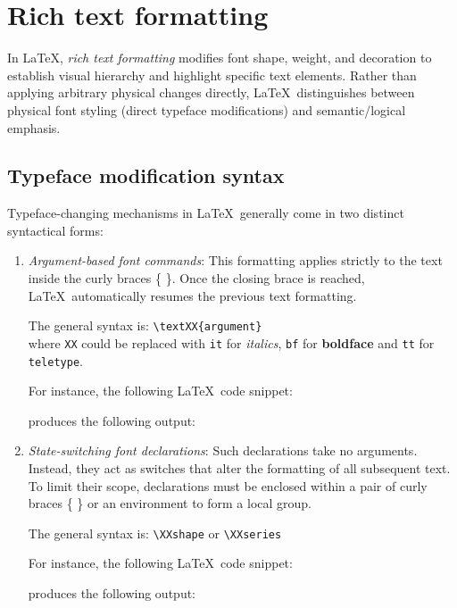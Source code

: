 \section{Rich text formatting}
	In \LaTeX, \emph{rich text formatting} modifies font shape, weight, and decoration to establish visual hierarchy and highlight specific text elements. Rather than applying arbitrary physical changes directly, \LaTeX\ distinguishes between physical font styling (direct typeface modifications) and semantic/logical emphasis.
	
	\subsection{Typeface modification syntax}
		Typeface-changing mechanisms in \LaTeX\ generally come in two distinct syntactical forms:
		\begin{enumerate}
			\item \emph{Argument-based font commands}: This formatting applies strictly to the text inside the curly braces \{ \}. Once the closing brace is reached, \LaTeX\ automatically resumes the previous text formatting.
			
			The general syntax is: \lstinline|\textXX{argument}|\\
			where \verb|XX| could be replaced with \verb|it| for \textit{italics}, \verb|bf| for \textbf{boldface} and \verb|tt| for \texttt{teletype}.
			
			For instance, the following \LaTeX\ code snippet:

			produces the following output:
			
			\item \emph{State-switching font declarations}: Such declarations take no arguments. Instead, they act as switches that alter the formatting of all subsequent text. To limit their scope, declarations must be enclosed within a pair of curly braces \{ \} or an environment to form a local group.
			
			The general syntax is: \lstinline|\XXshape| or \lstinline|\XXseries|
			
			For instance, the following \LaTeX\ code snippet:

			produces the following output:
		\end{enumerate}
		
